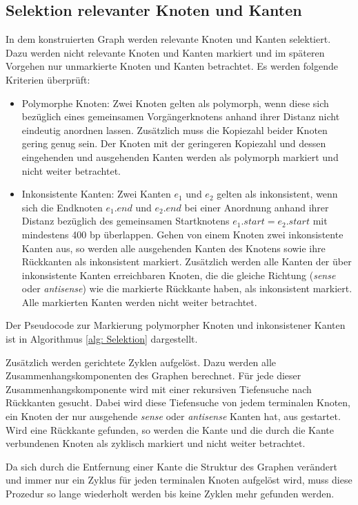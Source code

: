 \documentclass[a4paper,10pt,parskip]{scrartcl}
\begin{document}
\subsection{Selektion relevanter Knoten und Kanten}
In dem konstruierten Graph werden relevante Knoten und Kanten
selektiert. Dazu werden nicht relevante Knoten und Kanten markiert und
im späteren Vorgehen nur unmarkierte Knoten und Kanten betrachtet. Es
werden folgende Kriterien überprüft:
\begin{itemize}
\item Polymorphe Knoten: Zwei Knoten gelten als polymorph, wenn diese
  sich bezüglich eines gemeinsamen Vorgängerknotens anhand ihrer
  Distanz nicht eindeutig anordnen lassen. Zusätzlich muss die
  Kopiezahl beider Knoten gering genug sein. Der Knoten mit der
  geringeren Kopiezahl und dessen eingehenden und ausgehenden Kanten
  werden als polymorph markiert und nicht weiter betrachtet.
\item Inkonsistente Kanten: Zwei Kanten $e_1$ und $e_2$ gelten als
  inkonsistent, wenn sich die Endknoten $e_1.end$ und $e_2.end$ bei
  einer Anordnung anhand ihrer Distanz bezüglich des gemeinsamen
  Startknotens $e_1.start = e_2.start$ mit mindestens 400 bp
  überlappen. Gehen von einem Knoten zwei inkonsistente Kanten aus, so
  werden alle ausgehenden Kanten des Knotens sowie ihre Rückkanten als
  inkonsistent markiert. Zusätzlich werden alle Kanten der über
  inkonsistente Kanten erreichbaren Knoten, die die gleiche Richtung
  (\textit{sense} oder \textit{antisense}) wie die markierte Rückkante
  haben, als inkonsistent markiert. Alle markierten Kanten werden
  nicht weiter betrachtet.
\end{itemize}
Der Pseudocode zur Markierung polymorpher Knoten und inkonsistener
Kanten ist in Algorithmus \ref{alg: Selektion} dargestellt.

Zusätzlich werden gerichtete Zyklen aufgelöst. Dazu werden alle
Zusammenhangskomponenten des Graphen berechnet. Für jede dieser
Zusammenhangskomponente wird mit einer rekursiven Tiefensuche nach
Rückkanten gesucht. Dabei wird diese Tiefensuche von jedem terminalen
Knoten, ein Knoten der nur ausgehende \textit{sense} oder
\textit{antisense} Kanten hat, aus gestartet. Wird eine Rückkante
gefunden, so werden die Kante und die durch die Kante verbundenen
Knoten als zyklisch markiert und nicht weiter betrachtet.

Da sich durch die Entfernung einer Kante die Struktur des Graphen
verändert und immer nur ein Zyklus für jeden terminalen Knoten
aufgelöst wird, muss diese Prozedur so lange wiederholt werden bis
keine Zyklen mehr gefunden werden.
\end{document}
